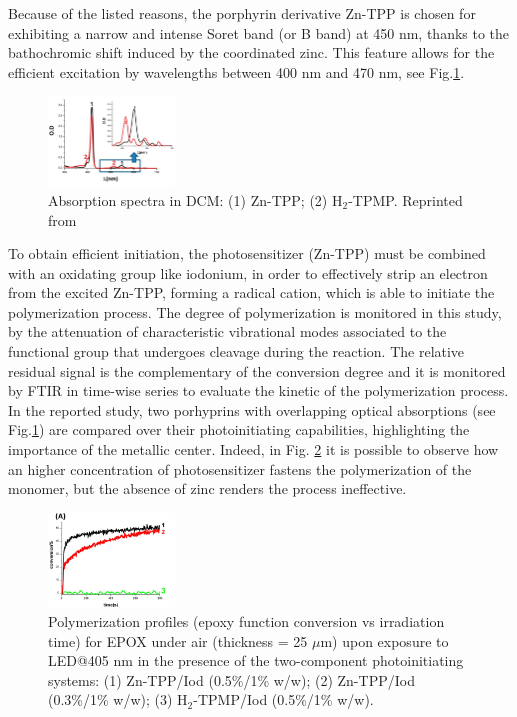 \documentclass[num-refs]{wiley-article}
\begin{document}
Because of the listed reasons, the porphyrin derivative Zn-TPP is chosen for exhibiting a narrow and intense Soret band (or B band) at 450 nm, thanks to the bathochromic shift induced by the coordinated zinc.
This feature allows for the efficient excitation by wavelengths between 400 nm and 470 nm, see Fig.\ref{UV-Vis-Zn-TPP}.
\begin{figure}
    \centering
    \includegraphics[width=0.3\textwidth]{UV-Vis-Zn-TPP}
    \caption{Absorption spectra in DCM: (1) Zn-TPP; (2) H$_{2}$-TPMP. Reprinted from \citet{al_mousawi_zinc_2017}}
    \label{UV-Vis-Zn-TPP}
\end{figure}
To obtain efficient initiation, the photosensitizer (Zn-TPP) must be combined with an oxidating group like iodonium, in order to effectively strip an electron from the excited Zn-TPP, forming a radical cation, which is able to initiate the polymerization process.
The degree of polymerization is monitored in this study, by the attenuation of characteristic vibrational modes associated to the functional group that undergoes cleavage during the reaction.
The relative residual signal is the complementary of the conversion degree and it is monitored by FTIR in time-wise series to evaluate the kinetic of the polymerization process.
In the reported study, two porhyprins with overlapping optical absorptions (see Fig.\ref{UV-Vis-Zn-TPP}) are compared over their photoinitiating capabilities, highlighting the importance of the metallic center.
Indeed, in Fig. \ref{conv-ZnTPP} it is possible to observe how an higher concentration of photosensitizer fastens the polymerization of the monomer, but the absence of zinc renders the process ineffective.
\begin{figure}
    \centering
    \includegraphics[width=0.3\textwidth]{conv-Zn-TPP}
    \caption{Polymerization profiles (epoxy function conversion vs irradiation time) for EPOX under air (thickness = 25 $\mu$m) upon exposure to
LED@405 nm in the presence of the two-component photoinitiating systems: (1) Zn-TPP/Iod (0.5\%/1\% w/w); (2) Zn-TPP/Iod (0.3\%/1\% w/w);
(3) H$_{2}$-TPMP/Iod (0.5\%/1\% w/w).}
    \label{conv-ZnTPP}
\end{figure}
\end{document}
